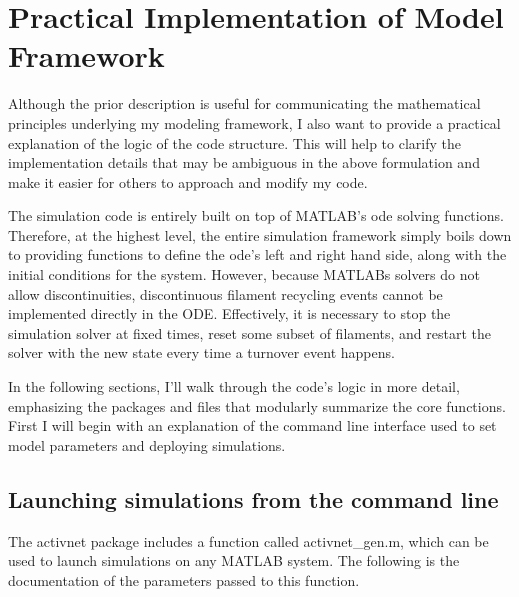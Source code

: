 

\section{Practical Implementation of Model Framework}

Although the prior description is useful for communicating the mathematical principles underlying my modeling framework, I also want to provide a practical explanation of the logic of the code structure.  This will help to clarify the implementation details that may be ambiguous in the above formulation and make it easier for others to approach and modify my code.

The simulation code is entirely built on top of MATLAB's ode solving functions.  Therefore, at the highest level, the entire simulation framework simply boils down to providing functions to define the ode's left and right hand side, along with the initial conditions for the system.  However, because MATLABs solvers do not allow discontinuities, discontinuous filament recycling events cannot be implemented directly in the ODE.  Effectively, it is necessary to stop the simulation solver at fixed times, reset some subset of filaments, and restart the solver with the new state every time a turnover event happens.


In the following sections, I'll walk through the code's logic in more detail, emphasizing the packages and files that modularly summarize the core functions.  First I will begin with an explanation of the command line interface used to set model parameters and deploying simulations.


\subsection{Launching simulations from the command line}



The activnet package includes a function called activnet\_gen.m, which can be used to launch simulations on any MATLAB system.  The following is the documentation of the parameters passed to this function.

